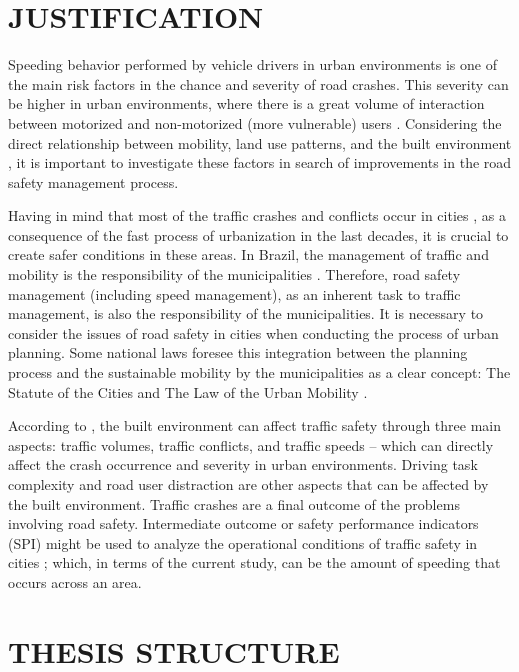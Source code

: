 \section{JUSTIFICATION}

Speeding behavior performed by vehicle drivers in urban environments is one of the main risk factors in the chance and severity of road crashes. This severity can be higher in urban environments, where there is a great volume of interaction between motorized and non-motorized (more vulnerable) users \cite{Elvik2009}. Considering the direct relationship between mobility, land use patterns, and the built environment \cite{DeVos2013}, it is important to investigate these factors in search of improvements in the road safety management process.

Having in mind that most of the traffic crashes and conflicts occur in cities \cite{WHO2018}, as a consequence of the fast process of urbanization in the last decades, it is crucial to create safer conditions in these areas. In Brazil, the management of traffic and mobility is the responsibility of the municipalities \cite{Brasil1997}. Therefore, road safety management (including speed management), as an inherent task to traffic management, is also the responsibility of the municipalities. It is necessary to consider the issues of road safety in cities when conducting the process of urban planning. Some national laws foresee this integration between the planning process and the sustainable mobility by the municipalities as a clear concept: The Statute of the Cities \cite{Brasil2001} and The Law of the Urban Mobility \cite{Brasil2012}.    

According to \textcite{Ewing2009}, the built environment can affect traffic safety through three main aspects: traffic volumes, traffic conflicts, and traffic speeds – which can directly affect the crash occurrence and severity in urban environments. Driving task complexity \cite{Onate-Vega2020} and road user distraction \cite{Chen2021} are other aspects that can be affected by the built environment. Traffic crashes are a final outcome of the problems involving road safety. Intermediate outcome or safety performance indicators (SPI) might be used to analyze the operational conditions of traffic safety in cities \cite{Bastos2014}; which, in terms of the current study, can be the amount of speeding that occurs across an area.

\section{THESIS STRUCTURE}

